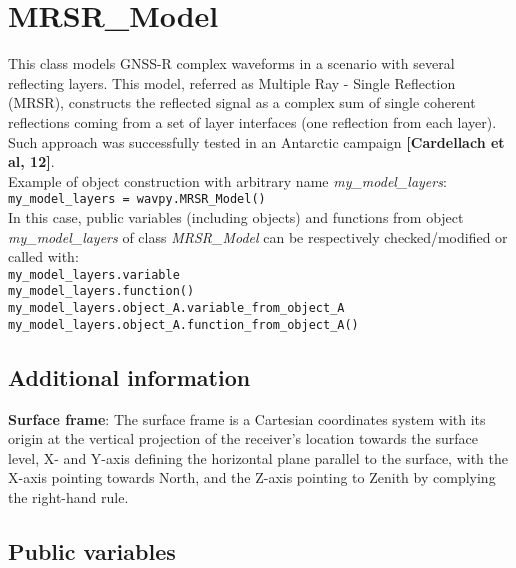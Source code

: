 \chapter{MRSR\_Model}\label{cha:MRSRmodel}

This class models GNSS-R complex waveforms in a scenario with several reflecting layers. This model, referred as Multiple Ray - Single
Reflection (MRSR), constructs the reflected signal as a complex sum of single coherent reflections coming from a set of layer interfaces (one reflection from each layer). Such approach was successfully tested in an Antarctic campaign {\bf [Cardellach et al, 12]}.\\

Example of object construction with arbitrary name {\it my\_model\_layers}:\\

\texttt{my\_model\_layers = wavpy.MRSR\_Model()}\\

In this case, public variables (including objects) and functions from object {\it my\_model\_layers} of class {\it MRSR\_Model} can be respectively checked/modified or called with:\\

\texttt{my\_model\_layers.variable}\\

\texttt{my\_model\_layers.function()}\\

\texttt{my\_model\_layers.object\_A.variable\_from\_object\_A}\\

\texttt{my\_model\_layers.object\_A.function\_from\_object\_A()}\\


\section{Additional information}

{\bf Surface frame}: The surface frame is a Cartesian coordinates system with its origin at the vertical projection of the receiver's location towards the surface level, X- and Y-axis defining the horizontal plane parallel to the surface, with the X-axis pointing towards North, and the Z-axis pointing to Zenith by complying the right-hand rule.


\section{Public variables}

